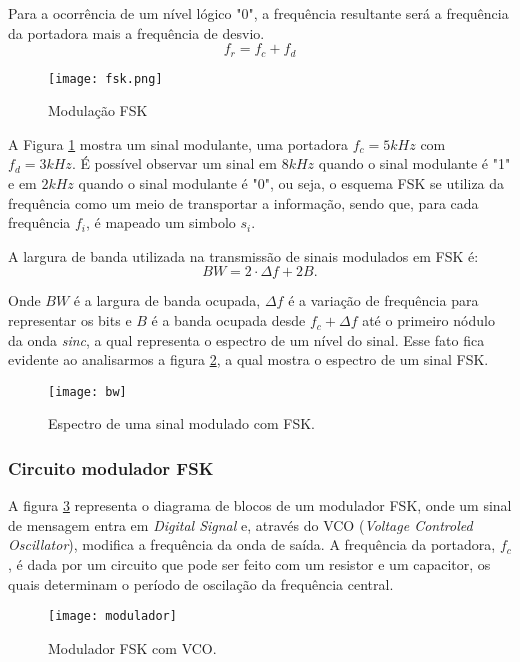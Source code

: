 Para a ocorrência de um nível lógico "0", a frequência resultante será a frequência da portadora mais a frequência de desvio.
\begin{equation}
f_r = f_c + f_d
\end{equation}

\begin{figure}[H]
    \centering
    \texttt{[image: fsk.png]}
    \caption{Modulação FSK}
    \label{fig:mdfsk}
\end{figure}

A Figura \ref{fig:mdfsk} mostra um sinal modulante, uma portadora $f_c=5kHz$ com $f_d = 3kHz$.
É possível observar um sinal em $8kHz$ quando o sinal modulante é "1" e em $2kHz$ quando o sinal modulante é "0", ou seja, o esquema FSK se utiliza da frequência como um meio de transportar a informação, sendo que, para cada frequência $f_i$, é mapeado um simbolo $s_i$.

A largura de banda utilizada na transmissão de sinais modulados em FSK é:
\[
BW = 2\cdot \Delta f +2B.
\]

Onde $BW$ é a largura de banda ocupada, $\Delta f$ é a variação de frequência para representar os bits e $B$ é a banda ocupada desde  $f_c + \Delta f$ até o primeiro nódulo da onda \textit{sinc}, a qual representa o espectro de um nível do sinal. 
Esse fato fica evidente ao analisarmos a figura \ref{fig:bw}, a qual mostra o espectro de um sinal FSK.

\begin{figure}[H]
    \centering
    \texttt{[image: bw]}
    \caption{Espectro de uma sinal modulado com FSK.}
    \label{fig:bw}
\end{figure}

\subsubsection{Circuito modulador FSK}

A figura \ref{fig:modulador} representa o diagrama de blocos de um modulador FSK, onde um sinal de mensagem entra em \textit{Digital Signal} e, através do VCO (\textit{Voltage Controled Oscillator}), modifica a frequência da onda de saída. A frequência da portadora, $f_c$, é dada por um circuito que pode ser feito com um resistor e um capacitor, os quais determinam o período de oscilação da frequência central.

\begin{figure}[H]
    \centering
    \texttt{[image: modulador]}
    \caption{Modulador FSK com VCO.}
    \label{fig:modulador}
\end{figure}
